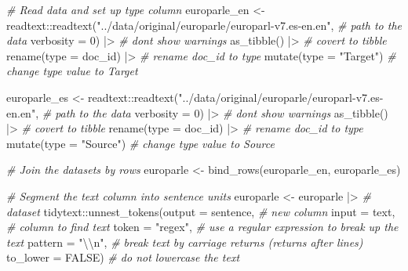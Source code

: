 \documentclass[
  letterpaper,
]{latex/krantz}
\newenvironment{Shaded}{\begin{snugshade}}{\end{snugshade}}
\newcommand{\AttributeTok}[1]{\textcolor[rgb]{0.00,0.00,0.00}{#1}}
\newcommand{\CommentTok}[1]{\textcolor[rgb]{0.00,0.00,0.00}{\textit{#1}}}
\newcommand{\ConstantTok}[1]{\textcolor[rgb]{0.00,0.00,0.00}{#1}}
\newcommand{\DecValTok}[1]{\textcolor[rgb]{0.00,0.00,0.00}{#1}}
\newcommand{\FunctionTok}[1]{\textcolor[rgb]{0.00,0.00,0.00}{#1}}
\newcommand{\NormalTok}[1]{\textcolor[rgb]{0.00,0.00,0.00}{#1}}
\newcommand{\OtherTok}[1]{\textcolor[rgb]{0.00,0.00,0.00}{#1}}
\newcommand{\SpecialCharTok}[1]{\textcolor[rgb]{0.00,0.00,0.00}{#1}}
\newcommand{\StringTok}[1]{\textcolor[rgb]{0.00,0.00,0.00}{#1}}
\begin{document}
\begin{Shaded}
\begin{Highlighting}[]
\CommentTok{\# Read data and set up \textasciigrave{}type\textasciigrave{} column}
\NormalTok{europarle\_en }\OtherTok{\textless{}{-}}  
\NormalTok{  readtext}\SpecialCharTok{::}\FunctionTok{readtext}\NormalTok{(}\StringTok{"../data/original/europarle/europarl{-}v7.es{-}en.en"}\NormalTok{, }\CommentTok{\# path to the data}
                     \AttributeTok{verbosity =} \DecValTok{0}\NormalTok{) }\SpecialCharTok{|\textgreater{}} \CommentTok{\# don\textquotesingle{}t show warnings}
  \FunctionTok{as\_tibble}\NormalTok{() }\SpecialCharTok{|\textgreater{}} \CommentTok{\# covert to tibble}
  \FunctionTok{rename}\NormalTok{(}\AttributeTok{type =}\NormalTok{ doc\_id) }\SpecialCharTok{|\textgreater{}} \CommentTok{\# rename doc\_id to type}
  \FunctionTok{mutate}\NormalTok{(}\AttributeTok{type =} \StringTok{"Target"}\NormalTok{) }\CommentTok{\# change type value to \textquotesingle{}Target\textquotesingle{}}

\NormalTok{europarle\_es }\OtherTok{\textless{}{-}} 
\NormalTok{  readtext}\SpecialCharTok{::}\FunctionTok{readtext}\NormalTok{(}\StringTok{"../data/original/europarle/europarl{-}v7.es{-}en.en"}\NormalTok{, }\CommentTok{\# path to the data}
                     \AttributeTok{verbosity =} \DecValTok{0}\NormalTok{) }\SpecialCharTok{|\textgreater{}}  \CommentTok{\# don\textquotesingle{}t show warnings}
  \FunctionTok{as\_tibble}\NormalTok{() }\SpecialCharTok{|\textgreater{}} \CommentTok{\# covert to tibble}
  \FunctionTok{rename}\NormalTok{(}\AttributeTok{type =}\NormalTok{ doc\_id) }\SpecialCharTok{|\textgreater{}} \CommentTok{\# rename doc\_id to type}
  \FunctionTok{mutate}\NormalTok{(}\AttributeTok{type =} \StringTok{"Source"}\NormalTok{) }\CommentTok{\# change type value to \textquotesingle{}Source\textquotesingle{}}

\CommentTok{\# Join the datasets by rows}
\NormalTok{europarle }\OtherTok{\textless{}{-}} 
  \FunctionTok{bind\_rows}\NormalTok{(europarle\_en, europarle\_es)}

\CommentTok{\# Segment the \textasciigrave{}text\textasciigrave{} column into \textasciigrave{}sentence\textasciigrave{} units}
\NormalTok{europarle }\OtherTok{\textless{}{-}} 
\NormalTok{  europarle }\SpecialCharTok{|\textgreater{}} \CommentTok{\# dataset}
\NormalTok{  tidytext}\SpecialCharTok{::}\FunctionTok{unnest\_tokens}\NormalTok{(}\AttributeTok{output =}\NormalTok{ sentence, }\CommentTok{\# new column}
                          \AttributeTok{input =}\NormalTok{ text, }\CommentTok{\# column to find text}
                          \AttributeTok{token =} \StringTok{"regex"}\NormalTok{, }\CommentTok{\# use a regular expression to break up the text}
                          \AttributeTok{pattern =} \StringTok{"}\SpecialCharTok{\textbackslash{}\textbackslash{}}\StringTok{n"}\NormalTok{, }\CommentTok{\# break text by carriage returns (returns after lines)}
                          \AttributeTok{to\_lower =} \ConstantTok{FALSE}\NormalTok{) }\CommentTok{\# do not lowercase the text}


\end{Highlighting}
\end{Shaded}
\end{document}
